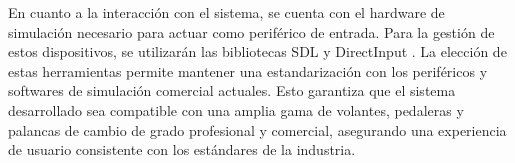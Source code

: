 En cuanto a la interacción con el sistema, se cuenta con el hardware de simulación necesario para actuar como periférico de entrada. Para la gestión de estos dispositivos, se utilizarán las bibliotecas SDL \cite{sdl} y DirectInput \cite{di}. La elección de estas herramientas permite mantener una estandarización con los periféricos y softwares de simulación comercial actuales. Esto garantiza que el sistema desarrollado sea compatible con una amplia gama de volantes, pedaleras y palancas de cambio de grado profesional y comercial, asegurando una experiencia de usuario consistente con los estándares de la industria.